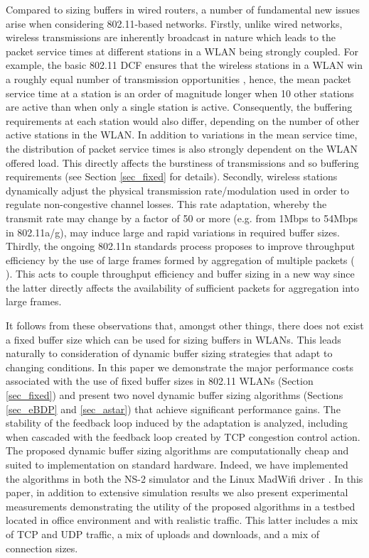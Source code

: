 \documentclass[10pt,twocolumn, journal]{IEEEtran}
\begin{document}
Compared to sizing buffers in wired routers, a number of fundamental new issues arise
when considering 802.11-based networks.   Firstly, unlike wired networks, wireless transmissions are inherently broadcast in nature which leads to the packet service times at different stations in a WLAN being strongly coupled.   For example, the basic 802.11 DCF ensures that the wireless stations in a WLAN win a roughly equal number of transmission opportunities \cite{David_TON_2006}, hence, the mean packet service time at a station is an order of magnitude longer when 10 other stations are active than when only a single station is active.  Consequently, the buffering requirements at each station would also differ, depending on the number of other active stations in the WLAN.   In addition to variations in the mean service time, the distribution of packet service times is also strongly dependent on the WLAN offered load.  This directly affects the burstiness of transmissions and so buffering requirements (see Section \ref{sec_fixed} for details).   Secondly, wireless stations dynamically adjust the physical transmission rate/modulation used in order to regulate non-congestive channel losses.   This rate adaptation, whereby the transmit rate may change by a factor of 50 or more (e.g. from 1Mbps to 54Mbps in 802.11a/g), may induce large and rapid variations in required buffer sizes.   Thirdly, the ongoing 802.11n standards process proposes to improve throughput efficiency by the use of large frames formed by aggregation of multiple packets (\cite{802.11n} \cite{Li_ton_2009}).  This acts to couple throughput efficiency and buffer sizing in a new way since the latter directly affects the availability of sufficient packets for aggregation into large frames.

It follows from these observations that, amongst other things, there does not exist a fixed buffer size which can be used for sizing buffers in WLANs.   This leads naturally to consideration of dynamic buffer sizing strategies that adapt to changing conditions.   In this paper we demonstrate the major performance costs associated with the use of fixed buffer sizes in 802.11 WLANs (Section \ref{sec_fixed}) and present two novel dynamic buffer sizing algorithms (Sections \ref{sec_eBDP} and \ref{sec_astar}) that achieve significant performance gains.  The stability of the feedback loop induced by the adaptation is analyzed, including when cascaded with the feedback loop created by TCP congestion control action. The proposed dynamic buffer sizing algorithms are computationally cheap and suited to implementation on standard hardware. Indeed, we have implemented the algorithms in both the NS-2 simulator and the Linux MadWifi driver \cite{madwifi}. In this paper, in addition to extensive simulation results we also present experimental measurements demonstrating the utility of the proposed algorithms in a testbed located in office environment and with realistic traffic. This latter includes a mix of TCP and UDP traffic, a mix of uploads and downloads, and a mix of connection sizes.
\end{document}
